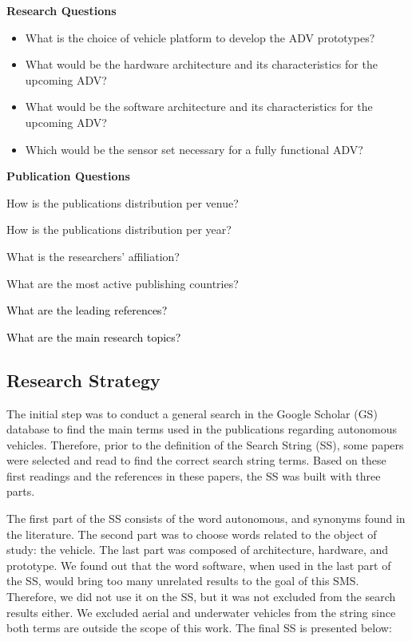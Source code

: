 \documentclass[lettersize,journal]{IEEEtran}
\begin{document}
\textbf{Research Questions}
\begin{itemize}
    \item[RQ1] What is the choice of vehicle platform to develop the ADV prototypes?
    \item[RQ2] What would be the hardware architecture and its characteristics for the upcoming ADV?
    \item[RQ3] What would be the software architecture and its characteristics for the upcoming ADV?
    \item[RQ4] Which would be the sensor set necessary for a fully functional ADV?
\end{itemize}

\textbf{Publication Questions}
\begin{itemize}
\item[PQ1] How is the publications distribution per venue?
\item[PQ2] How is the publications distribution per year?
\item[PQ3] What is the researchers' affiliation?
\item[PQ4] What are the most active publishing countries?
\textcolor{black}{\item[PQ5] What are the leading references?}
\textcolor{black}{\item[PQ5] What are the main research topics?}
\end{itemize}

\subsection{Research Strategy}

The initial step was to conduct a general search in the Google Scholar (GS) database to find the main terms used in the publications regarding autonomous vehicles. Therefore, prior to the definition of the Search String (SS), some papers were selected and read \cite{Hussain2019,Liu2017c,Burgio2017,Kato2018,Wang2017} to find the correct search string terms. Based on these first readings and the references in these papers, the SS was built with three parts. 

The first part of the SS consists of the word autonomous, and synonyms found in the literature. The second part was to choose words related to the object of study: the vehicle. The last part was composed of architecture, hardware, and prototype. We found out that the word software, when used in the last part of the SS, would bring too many unrelated results to the goal of this SMS. Therefore, we did not use it on the SS, but it was not excluded from the search results either. We excluded aerial and underwater vehicles from the string since both terms are outside the scope of this work. The final SS is presented below:
\\
\end{document}
